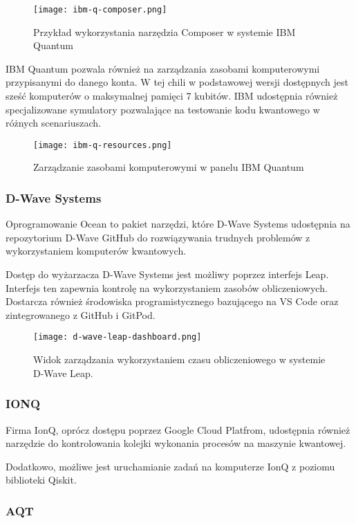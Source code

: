 \documentclass[a4paper,12pt
]{article}
\begin{document}
\begin{figure}
\centering
\texttt{[image: ibm-q-composer.png]}
\caption{Przykład wykorzystania narzędzia Composer w systemie IBM
Quantum}
\end{figure}

IBM Quantum pozwala również na zarządzania zasobami komputerowymi
przypisanymi do danego konta. W tej chili w podstawowej wersji
dostępnych jest sześć komputerów o maksymalnej pamięci 7 kubitów. IBM
udostępnia również specjalizowane symulatory pozwalające na testowanie
kodu kwantowego w różnych scenariuszach.

\begin{figure}
\centering
\texttt{[image: ibm-q-resources.png]}
\caption{Zarządzanie zasobami komputerowymi w panelu IBM Quantum}
\end{figure}

\hypertarget{d-wave-systems}{%
\subsubsection{D-Wave Systems}\label{d-wave-systems}}

Oprogramowanie Ocean to pakiet narzędzi, które D-Wave Systems udostępnia
na repozytorium D-Wave GitHub do rozwiązywania trudnych problemów z
wykorzystaniem komputerów kwantowych.

Dostęp do wyżarzacza D-Wave Systems jest możliwy poprzez interfejs Leap.
Interfejs ten zapewnia kontrolę na wykorzystaniem zasobów obliczeniowych.
Dostarcza również środowiska programistycznego bazującego na VS Code oraz
zintegrowanego z GitHub i GitPod.

\begin{figure}
\centering
\texttt{[image: d-wave-leap-dashboard.png]}
\caption{Widok zarządzania wykorzystaniem czasu obliczeniowego w
systemie D-Wave Leap.}
\end{figure}

\hypertarget{ionq}{%
\subsubsection{IONQ}\label{ionq}}

Firma IonQ, oprócz dostępu poprzez Google Cloud Platfrom, udostępnia
również narzędzie do kontrolowania kolejki wykonania procesów na
maszynie kwantowej.

Dodatkowo, możliwe jest uruchamianie zadań na komputerze IonQ z poziomu
biblioteki Qiskit.

\hypertarget{aqt}{%
\subsubsection{AQT}\label{aqt}}
\end{document}
